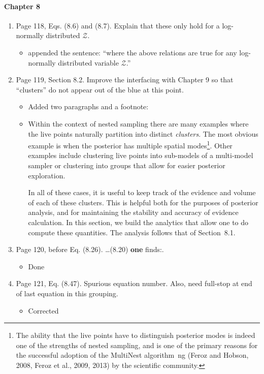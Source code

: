 \documentclass[11pt]{article}
\begin{document}
\paragraph{Chapter 8}
\begin{enumerate}
\item Page 118, Eqs. (8.6) and (8.7). Explain that these only hold for
  a log-normally distributed $\mathcal{Z}$.
  \begin{itemize}
      \item appended the sentence: ``where the above relations are true for any log-normally distributed variable \(\mathcal{Z}\).''
  \end{itemize}
\item Page 119, Section 8.2. Improve the interfacing with Chapter 9 so
  that ``clusters'' do not appear out of the blue at this point.
  \begin{itemize}
      \item Added two paragraphs and a footnote:
      \item Within the context of nested sampling there are many examples where the live points naturally partition into distinct {\em clusters}. The most obvious example is when the posterior has multiple spatial modes\footnote{The ability that the live points have to distinguish posterior modes is indeed one of the strengths of nested sampling, and is one of the primary reasons for the successful adoption of the MultiNest algorithm~ng (Feroz and Hobson, 2008, Feroz et al., 2009, 2013) by the scientific community.}. Other examples include clustering live points into sub-models of a multi-model sampler or clustering into groups that allow for easier posterior exploration.

          In all of these cases, it is useful to keep track of the evidence and volume of each of these clusters. This is helpful both for the purposes of posterior analysis, and for maintaining the stability and accuracy of evidence calculation. In this section, we build the analytics that allow one to do compute these quantities. The analysis follows that of Section~8.1.
  \end{itemize}
\item Page 120, before Eq. (8.26).  \ldots (8.20) \textbf{one} finds:.
    \begin{itemize}
        \item Done
    \end{itemize}
\item Page 121, Eq. (8.47). Spurious equation number. Also, need
  full-stop at end of last equation in this grouping.
  \begin{itemize}
      \item Corrected
  \end{itemize}
\end{enumerate}
\end{document}
